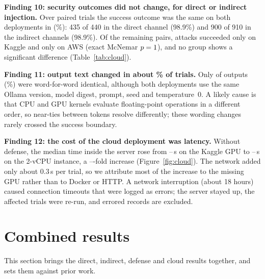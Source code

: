 \documentclass[a4paper,fleqn]{cas-dc}
\begin{document}
\textbf{Finding 10: security outcomes did not change, for direct or indirect injection.}
Over \cloudN{} paired trials the success outcome was the same on both deployments in \cloudAgree{} (\cloudAgreePct\%): 435 of 440 in the direct channel (98.9\%) and 900 of 910 in the indirect channels (98.9\%).
Of the remaining pairs, \cloudOnlyK{} attacks succeeded only on Kaggle and \cloudOnlyA{} only on AWS (exact McNemar $p = 1$), and no group shows a significant difference (Table~\ref{tab:cloud}).

\textbf{Finding 11: output text changed in about \cloudDiffPct\% of trials.}
Only \cloudSame{} of \cloudN{} outputs (\cloudSamePct\%) were word-for-word identical, although both deployments use the same Ollama version, model digest, prompt, seed and temperature~0.
A likely cause is that CPU and GPU kernels evaluate floating-point operations in a different order, so near-ties between tokens resolve differently; these wording changes rarely crossed the success boundary.

\textbf{Finding 12: the cost of the cloud deployment was latency.}
Without defense, the median time inside the server rose from \cloudSrvKMin--\cloudSrvKMax\,s on the Kaggle GPU to \cloudSrvAMin--\cloudSrvAMax\,s on the 2-vCPU instance, a \cloudRatioMin--\cloudRatioMax-fold increase (Figure~\ref{fig:cloud}).
The network added only about 0.3\,s per trial, so we attribute most of the increase to the missing GPU rather than to Docker or HTTP.
A network interruption (about 18 hours) caused connection timeouts that were logged as errors; the server stayed up, the affected trials were re-run, and errored records are excluded.

\section{Combined results}\label{sec:combined}
This section brings the direct, indirect, defense and cloud results together, and sets them against prior work.
\end{document}
